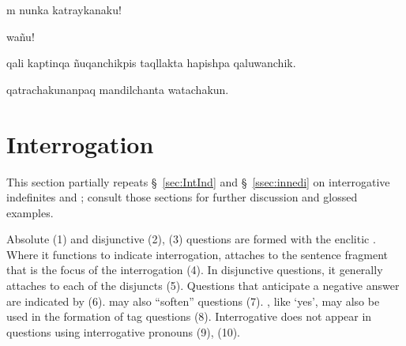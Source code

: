 %
{\textexclamdown{}m nunka katraykanaku!}%
{}%
{}{}%

%
{\textexclamdown{} wa\~nu!\dag{}}%
{}%
{}{}%

%
{ qali kaptinqa \~nuqanchikpis taqllakta hapishpa qaluwanchik.}%
{}%
{}{}%

%
{ qatrachakunanpaq mandilchanta watachakun.}%
{}%
{}{}%

\section{Interrogation}\label{sec:interr}
This section partially repeats \S~\ref{sec:IntInd}  and \S~\ref{ssec:innedi} on interrogative indefinites and ; consult those sections for further discussion and glossed examples.

Absolute (1) and disjunctive (2), (3) questions are formed with the enclitic . Where it functions to indicate interrogation,  attaches to the sentence fragment that is the focus of the interrogation (4). In disjunctive questions, it generally attaches to each of the disjuncts (5). Questions that anticipate a negative answer are indicated by  (6).  may also ``soften'' questions (7). , like  `yes', may also be used in the formation of tag questions (8). Interrogative  does not appear in questions using interrogative pronouns (9), (10).

